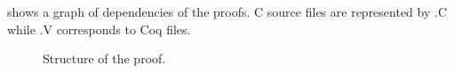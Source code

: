  shows a graph of dependencies of the proofs.
C source files are represented by {\color{doc@lstfunctions}.C} while
  {\color{doc@lstfunctions}.V} corresponds to Coq files.

\begin{figure}[h]
  \centering
  
  \caption{Structure of the proof.}
  \label{tikz:ProofOverview}
\end{figure}


%
%
